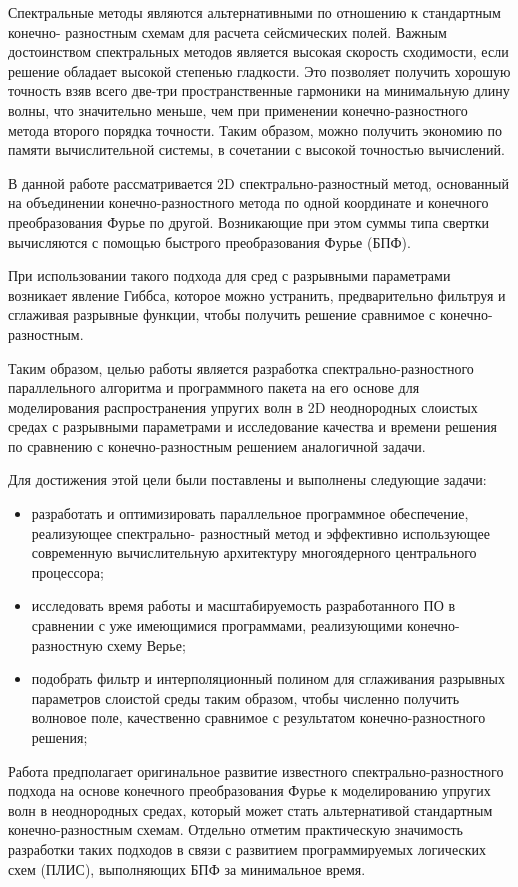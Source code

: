 Спектральные методы являются альтернативными по отношению к стандартным конечно-
разностным схемам для расчета сейсмических полей. Важным достоинством
спектральных методов является высокая скорость сходимости, если решение обладает
высокой степенью гладкости. Это позволяет получить хорошую точность взяв всего две-три
пространственные гармоники на минимальную длину волны, что значительно меньше, 
чем при применении конечно-разностного метода второго порядка точности.
Таким образом, можно получить экономию по памяти вычислительной системы, в сочетании с высокой точностью вычислений.

В данной работе рассматривается 2D спектрально-разностный метод, основанный на
объединении конечно-разностного метода по одной координате и конечного
преобразования Фурье по другой. Возникающие при этом суммы
типа свертки вычисляются с помощью быстрого преобразования Фурье (БПФ).

При использовании такого подхода для сред с разрывными параметрами возникает явление Гиббса,
которое можно устранить, предварительно фильтруя и сглаживая разрывные функции,
чтобы получить решение сравнимое с конечно-разностным.

Таким образом, целью работы является разработка спектрально-разностного
параллельного алгоритма и программного пакета на его основе для моделирования распространения
упругих волн в 2D неоднородных слоистых средах с разрывными параметрами и
исследование качества и времени решения по сравнению с конечно-разностным решением
аналогичной задачи.

Для достижения этой цели были поставлены и выполнены следующие задачи:
\begin{itemize}
    \item разработать и
оптимизировать параллельное программное обеспечение, реализующее спектрально-
разностный метод и эффективно использующее современную вычислительную
архитектуру многоядерного центрального процессора;
    \item исследовать время работы и масштабируемость разработанного ПО в
сравнении с уже имеющимися программами, реализующими конечно-разностную схему
Верье;
    \item подобрать фильтр и интерполяционный полином для
сглаживания разрывных параметров слоистой среды таким образом, чтобы численно получить волновое поле,
качественно сравнимое с результатом конечно-разностного решения;
\end{itemize}

Работа предполагает оригинальное развитие известного спектрально-разностного подхода
на основе конечного преобразования Фурье к моделированию упругих волн в
неоднородных средах, который может стать альтернативой стандартным конечно-разностным схемам.
Отдельно отметим практическую значимость разработки таких подходов в связи с развитием
программируемых логических схем (ПЛИС), выполняющих БПФ за минимальное время.

\clearpage

